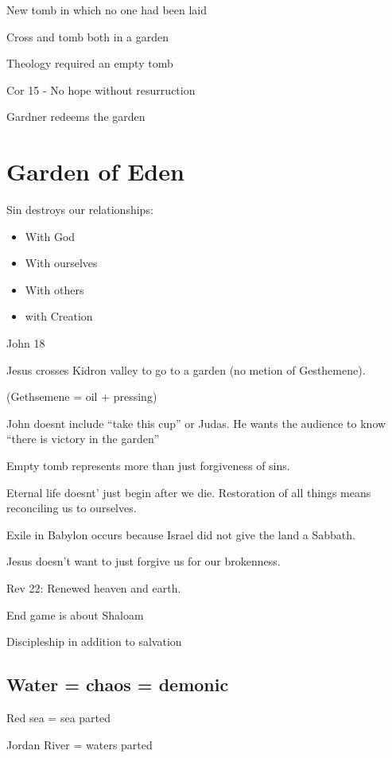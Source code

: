 \documentclass[
]{book}
\providecommand{\tightlist}{%
  \setlength{\itemsep}{0pt}\setlength{\parskip}{0pt}}
\begin{document}
New tomb in which no one had been laid

Cross and tomb both in a garden

Theology required an empty tomb

Cor 15 - No hope without resurruction

Gardner redeems the garden

\hypertarget{garden-of-eden}{%
\section{Garden of Eden}\label{garden-of-eden}}

Sin destroys our relationships:

\begin{itemize}
\tightlist
\item
  With God
\item
  With ourselves
\item
  With others
\item
  with Creation
\end{itemize}

John 18

Jesus crosses Kidron valley to go to a garden (no metion of Gesthemene).

(Gethsemene = oil + pressing)

John doesnt include ``take this cup'' or Judas. He wants the audience to know ``there is victory in the garden''

Empty tomb represents more than just forgiveness of sins.

Eternal life doesnt' just begin after we die. Restoration of all things means reconciling us to ourselves.

Exile in Babylon occurs because Israel did not give the land a Sabbath.

Jesus doesn't want to just forgive us for our brokenness.

Rev 22: Renewed heaven and earth.

End game is about Shaloam

Discipleship in addition to salvation

\hypertarget{water-chaos-demonic}{%
\subsection{Water = chaos = demonic}\label{water-chaos-demonic}}

Red sea = sea parted

Jordan River = waters parted
\end{document}
